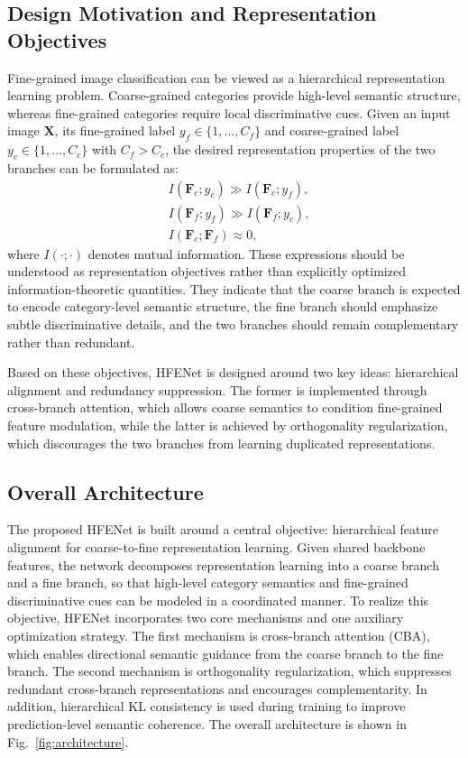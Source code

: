 \documentclass[pdflatex,iicol,sn-mathphys-num]{sn-jnl}
\theoremstyle{thmstyleone}%
\theoremstyle{thmstyletwo}%
\theoremstyle{thmstylethree}%
\begin{document}
\subsection{Design Motivation and Representation Objectives}

Fine-grained image classification can be viewed as a hierarchical representation learning problem. Coarse-grained categories provide high-level semantic structure, whereas fine-grained categories require local discriminative cues. Given an input image $\mathbf{X}$, its fine-grained label $y_f \in \{1,\dots,C_f\}$ and coarse-grained label $y_c \in \{1,\dots,C_c\}$ with $C_f > C_c$, the desired representation properties of the two branches can be formulated as:
\begin{equation}
\begin{aligned}
&I(\mathbf{F}_c; y_c) \gg I(\mathbf{F}_c; y_f), \\
&I(\mathbf{F}_f; y_f) \gg I(\mathbf{F}_f; y_c), \\
&I(\mathbf{F}_c; \mathbf{F}_f) \approx 0,
\end{aligned}
\label{eq:information_constraints}
\end{equation}
where $I(\cdot;\cdot)$ denotes mutual information. These expressions should be understood as representation objectives rather than explicitly optimized information-theoretic quantities. They indicate that the coarse branch is expected to encode category-level semantic structure, the fine branch should emphasize subtle discriminative details, and the two branches should remain complementary rather than redundant.

Based on these objectives, HFENet is designed around two key ideas: hierarchical alignment and redundancy suppression. The former is implemented through cross-branch attention, which allows coarse semantics to condition fine-grained feature modulation, while the latter is achieved by orthogonality regularization, which discourages the two branches from learning duplicated representations.

\subsection{Overall Architecture}
The proposed HFENet is built around a central objective: hierarchical feature alignment for coarse-to-fine representation learning. 
Given shared backbone features, the network decomposes representation learning into a coarse branch and a fine branch, so that high-level category semantics and fine-grained discriminative cues can be modeled in a coordinated manner. 
To realize this objective, HFENet incorporates two core mechanisms and one auxiliary optimization strategy. 
The first mechanism is cross-branch attention (CBA), which enables directional semantic guidance from the coarse branch to the fine branch. 
The second mechanism is orthogonality regularization, which suppresses redundant cross-branch representations and encourages complementarity. 
In addition, hierarchical KL consistency is used during training to improve prediction-level semantic coherence. 
The overall architecture is shown in Fig.~\ref{fig:architecture}.
\end{document}
